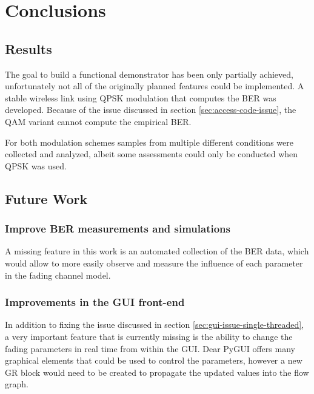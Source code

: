 
\chapter{Conclusions} \label{chp:conclusions}

\section{Results}

The goal to build a functional demonstrator has been only partially achieved, unfortunately not all of the originally planned features could be implemented. A stable wireless link using QPSK modulation that computes the BER was developed. Because of the issue discussed in section \ref{sec:access-code-issue}, the QAM variant cannot compute the empirical BER.

For both modulation schemes samples from multiple different conditions were collected and analyzed, albeit some assessments could only be conducted when QPSK was used.

\section{Future Work}

\subsection{Improve BER measurements and simulations}

A missing feature in this work is an automated collection of the BER data, which would allow to more easily observe and measure the influence of each parameter in the fading channel model.

\subsection{Improvements in the GUI front-end} %

In addition to fixing the issue discussed in section \ref{sec:gui-issue-single-threaded}, a very important feature that is currently missing is the ability to change the fading parameters in real time from within the GUI. Dear PyGUI offers many graphical elements that could be used to control the parameters, however a new GR block would need to be created to propagate the updated values into the flow graph.

